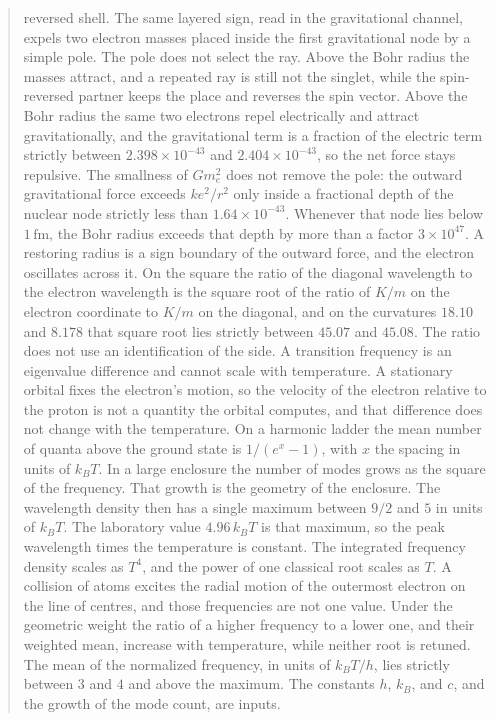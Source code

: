 \documentclass[a4paper]{article}
\begin{document}
\begin{abstract}
reversed shell. The same layered sign, read in the gravitational channel, expels two electron masses placed inside the first gravitational node by a simple pole. The pole does not select the ray. Above the Bohr radius the masses attract, and a repeated ray is still not the singlet, while the spin-reversed partner keeps the place and reverses the spin vector. Above the Bohr radius the same two electrons repel electrically and attract gravitationally, and the gravitational term is a fraction of the electric term strictly between \(2.398\times 10^{-43}\) and \(2.404\times 10^{-43}\), so the net force stays repulsive. The smallness of \(G m_e^{2}\) does not remove the pole: the outward gravitational force exceeds \(k e^{2}/r^{2}\) only inside a fractional depth of the nuclear node strictly less than \(1.64\times 10^{-43}\). Whenever that node lies below \(1\,\mathrm{fm}\), the Bohr radius exceeds that depth by more than a factor \(3\times 10^{47}\). A restoring radius is a sign boundary of the outward force, and the electron oscillates across it. On the square the ratio of the diagonal wavelength to the electron wavelength is the square root of the ratio of \(K/m\) on the electron coordinate to \(K/m\) on the diagonal, and on the curvatures \(18.10\) and \(8.178\) that square root lies strictly between \(45.07\) and \(45.08\). The ratio does not use an identification of the side. A transition frequency is an eigenvalue difference and cannot scale with temperature. A stationary orbital fixes the electron's motion, so the velocity of the electron relative to the proton is not a quantity the orbital computes, and that difference does not change with the temperature. On a harmonic ladder the mean number of quanta above the ground state is \(1/(e^{x}-1)\), with \(x\) the spacing in units of \(k_B T\). In a large enclosure the number of modes grows as the square of the frequency. That growth is the geometry of the enclosure. The wavelength density then has a single maximum between \(9/2\) and \(5\) in units of \(k_B T\). The laboratory value \(4.96\,k_B T\) is that maximum, so the peak wavelength times the temperature is constant. The integrated frequency density scales as \(T^{4}\), and the power of one classical root scales as \(T\). A collision of atoms excites the radial motion of the outermost electron on the line of centres, and those frequencies are not one value. Under the geometric weight the ratio of a higher frequency to a lower one, and their weighted mean, increase with temperature, while neither root is retuned. The mean of the normalized frequency, in units of \(k_B T/h\), lies strictly between \(3\) and \(4\) and above the maximum. The constants \(h\), \(k_B\), and \(c\), and the growth of the mode count, are inputs.
\end{abstract}
\end{document}

